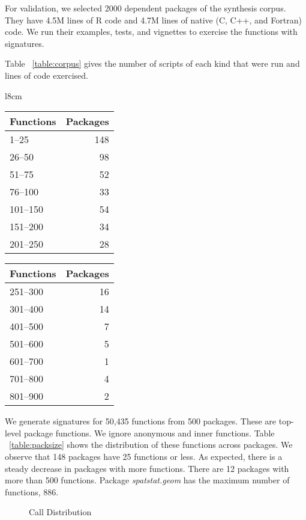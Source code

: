 \documentclass[screen,acmsmall]{acmart}
\begin{document}
For validation, we selected 2000 dependent packages of the synthesis
corpus. They have 4.5M lines of R code and 4.7M lines of native (C, C++, and
Fortran) code. We run their examples, tests, and vignettes to exercise the
functions with signatures.

Table ~\ref{table:corpus} gives the number of scripts of each kind that were run
and lines of code exercised.

\begin{wraptable}{l}{8cm}
  \vspace{-3mm}
  \small
  \caption{Package Size} \label{table:packsize}
  \centering
  \begin{tabular}{lr}
    \toprule
    \bf Functions&\bf Packages\\
    \midrule
    1--25&148\\
    26--50&98\\
    51--75&52\\
    76--100&33\\
    101--150&54\\
    151--200&34\\
    201--250&28\\
    \bottomrule
  \end{tabular}
  \quad
  \begin{tabular}{lr}
    \toprule
    \bf Functions&\bf Packages\\
    \midrule
    251--300&16\\
    301--400&14\\
    401--500&7\\
    501--600&5\\
    601--700&1\\
    701--800&4\\
    801--900&2\\
    \bottomrule
  \end{tabular}
\end{wraptable}

We generate signatures for 50,435 functions from 500 packages. These are
top-level package functions. We ignore anonymous and inner functions. Table
~\ref{table:packsize} shows the distribution of these functions across packages.
We observe that 148 packages have 25 functions or less. As expected, there is a
steady decrease in packages with more functions. There are 12 packages with more
than 500 functions. Package \emph{spatstat.geom} has the maximum number of
functions, 886.

\begin{figure}[!h]
  \centering
  
  \caption{Call Distribution}
  \label{fig:callDist}
\end{figure}
\end{document}
